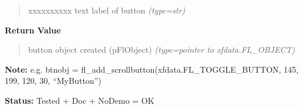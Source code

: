 \begin{boxedminipage}{\funcwidth}
\begin{quote}
\begin{Ventry}{xxxxxxxxxx}
text label of button
            {\it (type=str)}

        \end{Ventry}

      \end{quote}

      \textbf{Return Value}
    \vspace{-1ex}

      \begin{quote}

button object created (pFlObject)
      {\it (type=pointer to xfdata.FL\_OBJECT)}

      \end{quote}

\textbf{Note:} 
e.g. btnobj = fl\_add\_scrollbutton(xfdata.FL\_TOGGLE\_BUTTON, 145,
199, 120, 30, ``MyButton'')


\textbf{Status:} 
Tested + Doc + NoDemo = OK


    \end{boxedminipage}

    \label{xformslib:flbutton:fl_add_labelbutton}

    \vspace{0.5ex}

